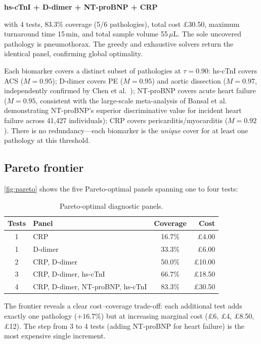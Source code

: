 \documentclass[times, twoside, watermark]{zHenriquesLab-StyleBioRxiv}
\begin{document}
\begin{center}
\textbf{hs-cTnI + D-dimer + NT-proBNP + CRP}
\end{center}

\noindent with 4 tests, 83.3\% coverage (5/6 pathologies), total cost \pounds30.50, maximum turnaround time 15\,min, and total sample volume 55\,$\mu$L. The sole uncovered pathology is pneumothorax. The greedy and exhaustive solvers return the identical panel, confirming global optimality.

Each biomarker covers a distinct subset of pathologies at $\tau = 0.90$: hs-cTnI covers ACS ($M = 0.95$); D-dimer covers PE ($M = 0.95$) and aortic dissection ($M = 0.97$, independently confirmed by Chen et al.~\cite{Chen2023}); NT-proBNP covers acute heart failure ($M = 0.95$, consistent with the large-scale meta-analysis of Bansal et al.~\cite{Bansal2025} demonstrating NT-proBNP's superior discriminative value for incident heart failure across 41,427 individuals); CRP covers pericarditis/myocarditis ($M = 0.92$). There is no redundancy---each biomarker is the \emph{unique} cover for at least one pathology at this threshold.

\subsection*{Pareto frontier}

\cref{fig:pareto} shows the five Pareto-optimal panels spanning one to four tests:

\begin{table}[h]
\centering
\caption{Pareto-optimal diagnostic panels.}
\label{tab:pareto}
\small
\begin{tabular}{@{}clcr@{}}
\toprule
\textbf{Tests} & \textbf{Panel} & \textbf{Coverage} & \textbf{Cost} \\
\midrule
1 & CRP & 16.7\% & \pounds4.00 \\
1 & D-dimer & 33.3\% & \pounds6.00 \\
2 & CRP, D-dimer & 50.0\% & \pounds10.00 \\
3 & CRP, D-dimer, hs-cTnI & 66.7\% & \pounds18.50 \\
4 & CRP, D-dimer, NT-proBNP, hs-cTnI & 83.3\% & \pounds30.50 \\
\bottomrule
\end{tabular}
\end{table}

\noindent The frontier reveals a clear cost--coverage trade-off: each additional test adds exactly one pathology ($+16.7\%$) but at increasing marginal cost (\pounds6, \pounds4, \pounds8.50, \pounds12). The step from 3 to 4 tests (adding NT-proBNP for heart failure) is the most expensive single increment.
\end{document}
